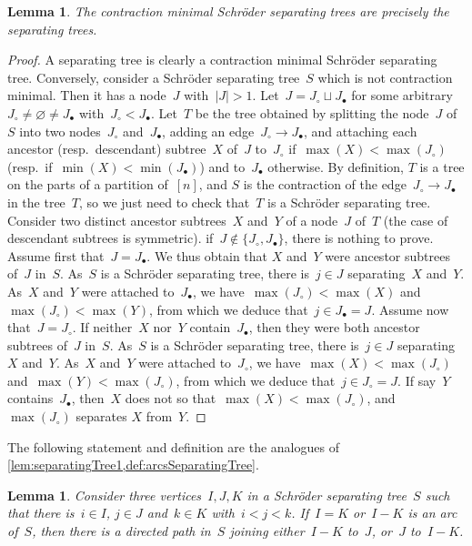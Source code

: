 \documentclass{amsart}
\newtheorem{lemma}[theorem]{Lemma}
\theoremstyle{definition}
\begin{document}
\begin{lemma}
\label{lem:decontractionSchroderSeparatingTree}
The contraction minimal Schröder separating trees are precisely the separating trees.
\end{lemma}

\begin{proof}
A separating tree is clearly a contraction minimal Schröder separating tree.
Conversely, consider a Schröder separating tree~$S$ which is not contraction minimal.
Then it has a node~$J$ with~$|J| > 1$.
Let~$J = J_\circ \sqcup J_\bullet$ for some arbitrary~$J_\circ \ne \varnothing \ne J_\bullet$ with~$J_\circ < J_\bullet$.
Let~$T$ be the tree obtained by splitting the node~$J$ of~$S$ into two nodes~$J_\circ$ and~$J_\bullet$, adding an edge~$J_\circ \to J_\bullet$, and attaching each ancestor (resp.~descendant) subtree~$X$ of~$J$ to~$J_\circ$ if~$\max(X) < \max(J_\circ)$ (resp.~if~$\min(X) < \min(J_\bullet)$) and to~$J_\bullet$ otherwise.
By definition, $T$ is a tree on the parts of a partition of~$[n]$, and $S$ is the contraction of the edge~$J_\circ \to J_\bullet$ in the tree~$T$, so we just need to check that~$T$ is a Schröder separating tree.
Consider two distinct ancestor subtrees~$X$ and~$Y$ of a node~$J$ of~$T$ (the case of descendant subtrees is symmetric).
if~$J \notin \{J_\circ, J_\bullet\}$, there is nothing to prove.
Assume first that~$J = J_\bullet$.
We thus obtain that $X$ and~$Y$ were ancestor subtrees of~$J$ in~$S$.
As~$S$ is a Schröder separating tree, there is~$j \in J$ separating~$X$ and~$Y$.
As~$X$ and~$Y$ were attached to~$J_\bullet$, we have~$\max(J_\circ) < \max(X)$ and~$\max(J_\circ) < \max(Y)$, from which we deduce that~$j \in J_\bullet = J$.
Assume now that~$J = J_\circ$.
If neither~$X$ nor~$Y$ contain~$J_\bullet$, then they were both ancestor subtrees of~$J$ in~$S$.
As~$S$ is a Schröder separating tree, there is~$j \in J$ separating~$X$ and~$Y$.
As~$X$ and~$Y$ were attached to~$J_\circ$, we have~$\max(X) < \max(J_\circ)$ and~$\max(Y) < \max(J_\circ)$, from which we deduce that~$j \in J_\circ = J$.
If say~$Y$ contains~$J_\bullet$, then~$X$ does not so that~$\max(X) < \max(J_\circ)$, and~$\max(J_\circ)$ separates $X$ from~$Y$.
\end{proof}

The following statement and definition are the analogues of \cref{lem:separatingTree1,def:arcsSeparatingTree}.

\begin{lemma}
\label{lem:SchroderSeparatingTree1}
Consider three vertices~$I,J,K$ in a Schröder separating tree~$S$ such that there is~$i \in I$, $j \in J$ and~$k \in K$ with~$i < j < k$.
If~$I = K$ or~$I - K$ is an arc of~$S$, then there is a directed path in~$S$ joining either~$I-K$ to~$J$, or~$J$ to~$I-K$.
\end{lemma}
\end{document}
